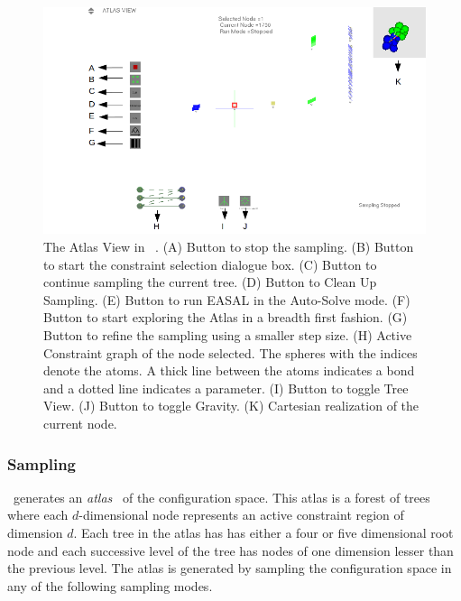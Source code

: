 \documentclass[10pt]{article}
\begin{document}
\begin{figure}[hp]
\centering
\includegraphics[width=1.\textwidth] {fig/AtlasView.png}
\caption{The Atlas View in \EASAL~. (A) Button to stop the sampling. (B) Button
to start the constraint selection dialogue box. (C) Button to continue sampling
the current tree. (D) Button to Clean Up Sampling. (E) Button to run EASAL in
the Auto-Solve mode. (F) Button to start exploring the Atlas in a breadth first
fashion. (G) Button to refine the sampling using a smaller step size. (H)
Active Constraint graph of the node selected. The spheres with the indices
denote the atoms. A thick line between the atoms indicates a bond and a dotted
line indicates a parameter. (I) Button to toggle Tree View. (J) Button to
toggle Gravity. (K) Cartesian realization of the current node.}
\label{AtlasView} \end{figure}

\subsubsection{Sampling}
\EASAL~generates an \emph{atlas}~\cite{Sitharam:2012:EASAL} of the configuration
space. This atlas is a forest of trees where each $d$-dimensional node represents
an active constraint region of dimension $d$. Each tree in the atlas has has either
a four or five dimensional root node and each successive level of the tree has nodes of
one dimension lesser than the previous level. The atlas is
generated by sampling the configuration space in any of the following sampling modes.
\end{document}
